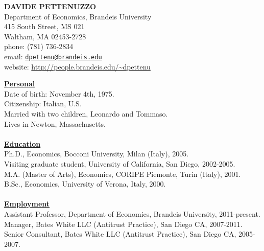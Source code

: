\documentclass[12pt]{article}
\begin{document}
\begin{center}
\textbf{DAVIDE PETTENUZZO} \\
Department of Economics, Brandeis University \\
415 South Street, MS 021 \\
Waltham, MA 02453-2728 \\
phone: (781) 736-2834 \\
email: \href{mailto:dpettenu@brandeis.edu}{\nolinkurl{dpettenu@brandeis.edu}} \\
website: \url{http://people.brandeis.edu/~dpettenu} \\
\end{center}
\hline 
\bigskip

\underline{\textbf{Personal}}\\
Date of birth: November 4th, 1975. \\
Citizenship: Italian, U.S. \\
Married with two children, Leonardo and Tommaso. \\
Lives in Newton, Massachusetts. \\ \\ 
\underline{\textbf{Education}}\\
Ph.D., Economics, Bocconi University, Milan (Italy), 2005.\\
Visiting graduate student, University of California, San Diego, 2002-2005. \\
M.A. (Master of Arts), Economics, CORIPE Piemonte, Turin (Italy), 2001. \\
B.Sc., Economics, University of Verona, Italy, 2000.\\ \\
\underline{\textbf{Employment}}\\
Assistant Professor, Department of Economics, Brandeis University, 2011-present.\\
Manager, Bates White LLC (Antitrust Practice), San Diego CA, 2007-2011.\\
Senior Consultant, Bates White LLC (Antitrust Practice), San Diego CA, 2005-2007. \\
\end{document}
